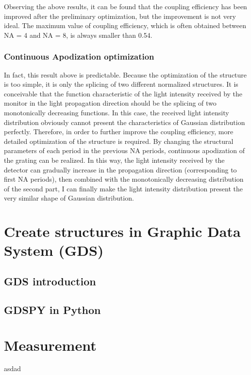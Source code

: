 \documentclass[]{article}
\begin{document}
Observing the above results, it can be found that the coupling efficiency has been improved after the preliminary optimization, but the improvement is not very ideal. The maximum value of coupling efficiency, which is often obtained between NA = 4 and NA = 8, is always smaller than 0.54.


\subsubsection{Continuous Apodization optimization}

In fact, this result above is predictable. Because the optimization of the structure is too simple, it is only the splicing of two different normalized structures. It is conceivable that the function characteristic of the light intensity received by the monitor in the light propagation direction should be the splicing of two monotonically decreasing functions. In this case, the received light intensity distribution obviously cannot present the characteristics of Gaussian distribution perfectly. Therefore, in order to further improve the coupling efficiency, more detailed optimization of the structure is required. By changing the structural parameters of each period in the previous NA periods, continuous apodization of the grating can be realized. In this way, the light intensity received by the detector can gradually increase in the propagation direction (corresponding to first NA periods), then combined with the monotonically decreasing distribution of the second part, I can finally make the light intensity distribution present the very similar shape of Gaussian distribution. 


\section{Create structures in Graphic Data System (GDS)}


\subsection{GDS introduction}

\subsection{GDSPY in Python}

\section{Measurement}

\newpage

\begin{thebibliography}{99}
asdad
\end{thebibliography}
\end{document}
